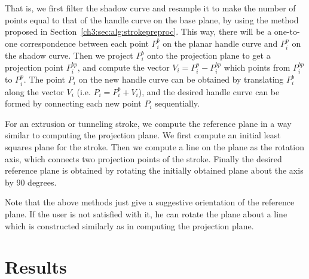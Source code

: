 That is, we first filter the shadow curve and resample it
to make the number of points equal to that of the handle
curve on the base plane, by using the method proposed in
Section~\ref{ch3:sec:alg:strokepreproc}. This way, there
will be a one-to-one correspondence between each point $P^b_i$
on the planar handle curve and $P^p_i$ on the shadow curve.
Then we project $P^b_i$ onto the projection plane to
get a projection point $P^{bp}_i$, and compute the
vector $V_i=P^p_i-P^{bp}_i$ which points from $P^{bp}_i$
to $P^p_i$. The point $P_i$ on the new handle curve
can be obtained by translating $P^b_i$ along the
vector $V_i$ (i.e. $P_i=P^b_i+V_i$), and the desired handle curve
can be formed by connecting each new point $P_i$ sequentially.

For an extrusion or tunneling stroke, we compute the reference plane
in a way similar to computing the projection plane. We first compute
an initial least squares plane for the stroke. Then we compute a
line on the plane as the rotation axis, which connects two
projection points of the stroke. Finally the desired reference plane
is obtained by rotating the initially obtained plane about the axis
by 90 degrees.

Note that the above methods just give a suggestive orientation of
the reference plane. If the user is not satisfied with it, he can
rotate the plane about a line which is constructed similarly as in
computing the projection plane.


\section{Results}
\label{ch3:sec:result}

